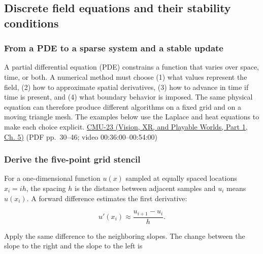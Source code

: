 \subsection{Discrete field equations and their stability conditions}\label{04-visual-computing-ii-ch030-discrete-field-equations-and-their-stability-conditions}

\hypertarget{04-visual-computing-ii-ch030-discrete-field-equations-and-their-stability-conditions}{}

\subsubsection{From a PDE to a sparse system and a stable update}\label{04-visual-computing-ii-ch030-from-a-pde-to-a-sparse-system-and-a-stable-update}

\hypertarget{04-visual-computing-ii-ch030-from-a-pde-to-a-sparse-system-and-a-stable-update}{}

A partial differential equation (PDE) constrains a function that varies over space, time, or both. A numerical method must choose (1) what values represent the field, (2) how to approximate spatial derivatives, (3) how to advance in time if time is present, and (4) what boundary behavior is imposed. The same physical equation can therefore produce different algorithms on a fixed grid and on a moving triangle mesh. The examples below use the Laplace and heat equations to make each choice explicit. \href{../07-Vision-XR-and-Playable-Worlds-P01/main.pdf\#nameddest=04-visual-computing-ii-ch036-cmu-23---physically-based-animation-and-pdes}{CMU-23 (Vision, XR, and Playable Worlds, Part 1, Ch. 5)} (PDF pp.~30--46; video 00:36:00--00:54:00)

\subsubsection{Derive the five-point grid stencil}\label{04-visual-computing-ii-ch030-derive-the-five-point-grid-stencil}

\hypertarget{04-visual-computing-ii-ch030-derive-the-five-point-grid-stencil}{}

For a one-dimensional function \(u(x)\) sampled at equally spaced locations \(x_i=ih\), the spacing \(h\) is the distance between adjacent samples and \(u_i\) means \(u(x_i)\). A forward difference estimates the first derivative:

\[
u'(x_i)\approx\frac{u_{i+1}-u_i}{h}.
\]

Apply the same difference to the neighboring slopes. The change between the slope to the right and the slope to the left is

